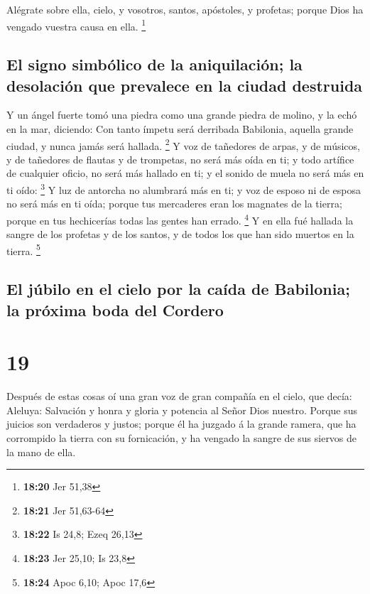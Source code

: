  Alégrate sobre ella, cielo, y vosotros, santos, apóstoles,
y profetas; porque Dios ha vengado vuestra causa en ella. \footnote{\textbf{18:20}
  Jer 51,38}

\hypertarget{el-signo-simbuxf3lico-de-la-aniquilaciuxf3n-la-desolaciuxf3n-que-prevalece-en-la-ciudad-destruida}{%
\subsection{El signo simbólico de la aniquilación; la desolación que
prevalece en la ciudad
destruida}\label{el-signo-simbuxf3lico-de-la-aniquilaciuxf3n-la-desolaciuxf3n-que-prevalece-en-la-ciudad-destruida}}

 Y un ángel fuerte tomó una piedra como una grande piedra
de molino, y la echó en la mar, diciendo: Con tanto ímpetu será
derribada Babilonia, aquella grande ciudad, y nunca jamás será hallada.
\footnote{\textbf{18:21} Jer 51,63-64}  Y voz de tañedores
de arpas, y de músicos, y de tañedores de flautas y de trompetas, no
será más oída en ti; y todo artífice de cualquier oficio, no será más
hallado en ti; y el sonido de muela no será más en ti oído: \footnote{\textbf{18:22}
  Is 24,8; Ezeq 26,13}  Y luz de antorcha no alumbrará más
en ti; y voz de esposo ni de esposa no será más en ti oída; porque tus
mercaderes eran los magnates de la tierra; porque en tus hechicerías
todas las gentes han errado. \footnote{\textbf{18:23} Jer 25,10; Is 23,8}
 Y en ella fué hallada la sangre de los profetas y de los
santos, y de todos los que han sido muertos en la tierra. \footnote{\textbf{18:24}
  Apoc 6,10; Apoc 17,6}

\hypertarget{el-juxfabilo-en-el-cielo-por-la-cauxedda-de-babilonia-la-pruxf3xima-boda-del-cordero}{%
\subsection{El júbilo en el cielo por la caída de Babilonia; la próxima
boda del
Cordero}\label{el-juxfabilo-en-el-cielo-por-la-cauxedda-de-babilonia-la-pruxf3xima-boda-del-cordero}}

\hypertarget{section-18}{%
\section{19}\label{section-18}}

 Después de estas cosas oí una gran voz de gran compañía en
el cielo, que decía: Aleluya: Salvación y honra y gloria y potencia al
Señor Dios nuestro.  Porque sus juicios son verdaderos y
justos; porque él ha juzgado á la grande ramera, que ha corrompido la
tierra con su fornicación, y ha vengado la sangre de sus siervos de la
mano de ella.

